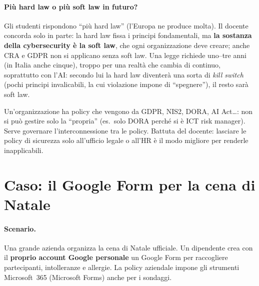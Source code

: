 \paragraph{Più hard law o più soft law in futuro?} Gli studenti rispondono ``più hard law'' (l'Europa
ne produce molta). Il docente concorda solo in parte: la hard law fissa i principi fondamentali, ma
\textbf{la sostanza della cybersecurity è la soft law}, che ogni organizzazione deve creare; anche
CRA e GDPR non si applicano senza soft law. Una legge richiede uno--tre anni (in Italia anche cinque),
troppo per una realtà che cambia di continuo, soprattutto con l'AI: secondo lui la hard law diventerà
una sorta di \emph{kill switch} (pochi principi invalicabili, la cui violazione impone di ``spegnere''),
il resto sarà soft law.
\begin{nota}
Un'organizzazione ha policy che vengono da GDPR, NIS2, DORA, AI Act\ldots: non si può gestire solo la
``propria'' (es.\ solo DORA perché si è ICT risk manager). Serve governare l'interconnessione tra le
policy. Battuta del docente: lasciare le policy di sicurezza solo all'ufficio legale o all'HR è il modo
migliore per renderle inapplicabili.
\end{nota}

\section{Caso: il Google Form per la cena di Natale}
\paragraph{Scenario.} Una grande azienda organizza la cena di Natale ufficiale. Un dipendente crea con il
\textbf{proprio account Google personale} un Google Form per raccogliere partecipanti, intolleranze e
allergie. La policy aziendale impone gli strumenti Microsoft~365 (Microsoft Forms) anche per i sondaggi.

